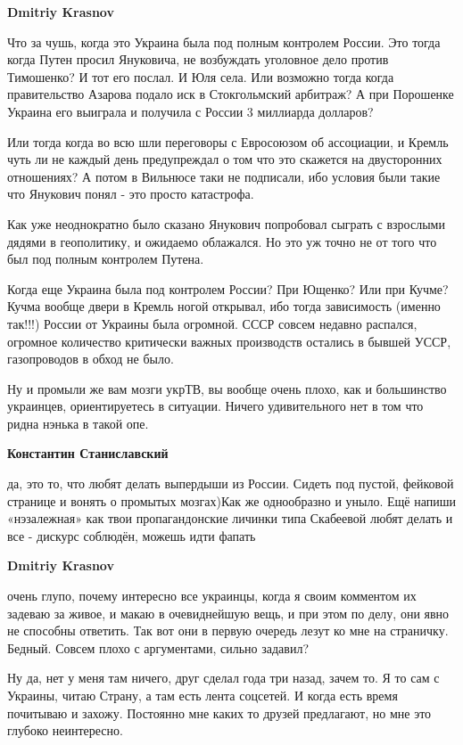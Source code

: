 \begin{itemize}
\begin{itemize}
\textbf{Dmitriy Krasnov} 

Что за чушь, когда это Украина была под полным контролем России. Это тогда
когда Путен просил Януковича, не возбуждать уголовное дело против Тимошенко? И
тот его послал. И Юля села. Или возможно тогда когда правительство Азарова
подало иск в Стокгольмский арбитраж? А при Порошенке Украина его выиграла и
получила с России 3 миллиарда долларов?

Или тогда когда во всю шли переговоры с Евросоюзом об ассоциации, и Кремль чуть
ли не каждый день предупреждал о том что это скажется на двусторонних
отношениях? А потом в Вильнюсе таки не подписали, ибо условия были такие что
Янукович понял - это просто катастрофа.

Как уже неоднократно было сказано Янукович попробовал сыграть с взрослыми
дядями в геополитику, и ожидаемо облажался. Но это уж точно не от того что был
под полным контролем Путена.

Когда еще Украина была под контролем России? При Ющенко? Или при Кучме? Кучма
вообще двери в Кремль ногой открывал, ибо тогда зависимость (именно так!!!)
России от Украины была огромной. СССР совсем недавно распался, огромное
количество критически важных производств остались в бывшей УССР, газопроводов в
обход не было.

Ну и промыли же вам мозги укрТВ, вы вообще очень плохо, как и большинство
украинцев, ориентируетесь в ситуации. Ничего удивительного нет в том что ридна
нэнька в такой опе.

\textbf{Константин Станиславский} 

да, это то, что любят делать выпердыши из России. Сидеть под пустой, фейковой
странице и вонять о промытых мозгах)Как же однообразно и уныло. Ещё напиши
«нэзалежная» как твои пропагандонские личинки типа Скабеевой любят делать и все
- дискурс соблюдён, можешь идти фапать


\textbf{Dmitriy Krasnov} 

очень глупо, почему интересно все украинцы, когда я своим комментом их задеваю
за живое, и макаю в очевиднейшую вещь, и при этом по делу, они явно не способны
ответить. Так вот они в первую очередь лезут ко мне на страничку. Бедный.
Совсем плохо с аргументами, сильно задавил?

Ну да, нет у меня там ничего, друг сделал года три назад, зачем то. Я то сам с
Украины, читаю Страну, а там есть лента соцсетей. И когда есть время почитываю
и захожу. Постоянно мне каких то друзей предлагают, но мне это глубоко
неинтересно.


\end{itemize}
\end{itemize}
